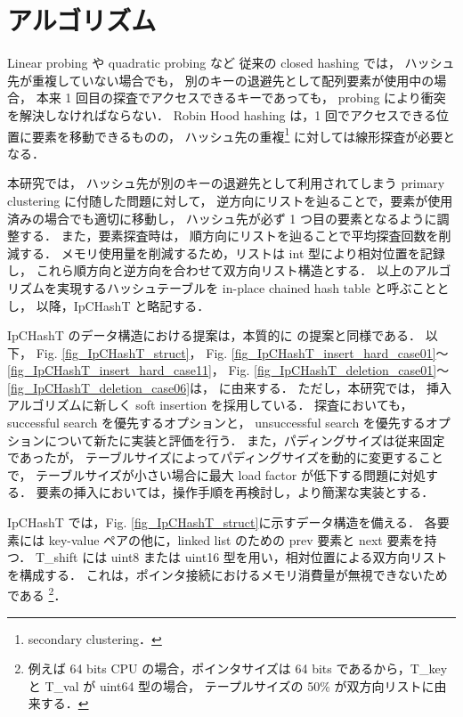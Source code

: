 \chapter{アルゴリズム}
\label{chap_Algorism}

Linear probing や quadratic probing など
従来の closed hashing では，
ハッシュ先が重複していない場合でも，
別のキーの退避先として配列要素が使用中の場合，
本来 1 回目の探査でアクセスできるキーであっても，
probing により衝突を解決しなければならない．
Robin Hood hashing は，1 回でアクセスできる位置に要素を移動できるものの，
ハッシュ先の重複\footnote{secondary clustering．} に対しては線形探査が必要となる．

本研究では，
ハッシュ先が別のキーの退避先として利用されてしまう primary clustering に付随した問題に対して，
逆方向にリストを辿ることで，要素が使用済みの場合でも適切に移動し，
ハッシュ先が必ず 1 つ目の要素となるように調整する．
また，要素探査時は，
順方向にリストを辿ることで平均探査回数を削減する．
メモリ使用量を削減するため，リストは int 型により相対位置を記録し，
これら順方向と逆方向を合わせて双方向リスト構造とする．
以上のアルゴリズムを実現するハッシュテーブルを in-place chained hash table と呼ぶこととし，
以降，IpCHashT と略記する．

IpCHashT のデータ構造における提案は，本質的に \cite{ADMIS2017} の提案と同様である．
以下，
Fig. \ref{fig_IpCHashT_struct}，
Fig. \ref{fig_IpCHashT_insert_hard_case01}〜\ref{fig_IpCHashT_insert_hard_case11}，
Fig. \ref{fig_IpCHashT_deletion_case01}〜\ref{fig_IpCHashT_deletion_case06}は，
\cite{ADMIS2017} に由来する．
ただし，本研究では，
挿入アルゴリズムに新しく soft insertion を採用している．
探査においても，
successful search を優先するオプションと，
unsuccessful search を優先するオプションについて新たに実装と評価を行う．
また，パディングサイズは従来固定であったが，
テーブルサイズによってパディングサイズを動的に変更することで，
テーブルサイズが小さい場合に最大 load factor が低下する問題に対処する．
要素の挿入においては，操作手順を再検討し，より簡潔な実装とする．

IpCHashT では，Fig. \ref{fig_IpCHashT_struct}に示すデータ構造を備える．
各要素には key-value ペアの他に，linked list のための prev 要素と next 要素を持つ．
T\_shift には uint8 または uint16 型を用い，相対位置による双方向リストを構成する．
これは，ポインタ接続におけるメモリ消費量が無視できないためである
\footnote{
  例えば 64 bits CPU の場合，ポインタサイズは 64 bits であるから，T\_key と T\_val が uint64 型の場合，
  テープルサイズの 50\% が双方向リストに由来する．
}．
\leavevmode \newline

